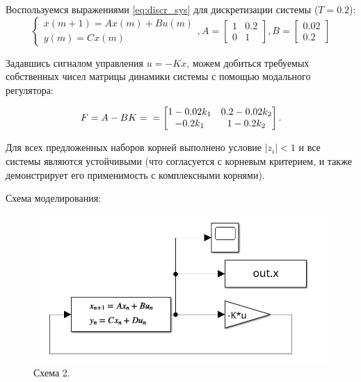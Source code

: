 \documentclass[a4paper, 14pt]{extarticle}
\theoremstyle{definition}
\theoremstyle{plain}
\theoremstyle{remark}
\begin{document}
Воспользуемся выражениями \ref{eq:discr_sys} для дискретизации системы ($T=0.2$):
\begin{equation}
	\begin{cases}
		x(m+1) = Ax(m) + Bu(m)\\
		y(m) = Cx(m)
	\end{cases}, A = \begin{bmatrix}
		1 & 0.2 \\
		0 & 1
	\end{bmatrix}, B = \begin{bmatrix}
		0.02 \\ 0.2
	\end{bmatrix}
\end{equation}

Задавшись сигналом управления $u = -Kx$, можем добиться требуемых собственных чисел матрицы динамики системы с помощью модального регулятора:

\begin{equation}
	F = A-BK= \\=\begin{bmatrix}
	1 - 0.02k_1 & 0.2 - 0.02k_2 \\ -0.2k_1 & 1 -0.2k_2
\end{bmatrix}.
\end{equation}

Для всех предложенных наборов корней выполнено условие $|z_i| < 1$ и все системы являются устойчивыми (что согласуется с корневым критерием, и также демонстрирует его применимость с комплексными корнями). 

Схема моделирования:
\begin{figure}
    [H]
    \centering
    \includegraphics[width=350pt]{images/scheme_2.png}
    \caption{Схема 2.}
\end{figure}
\end{document}
